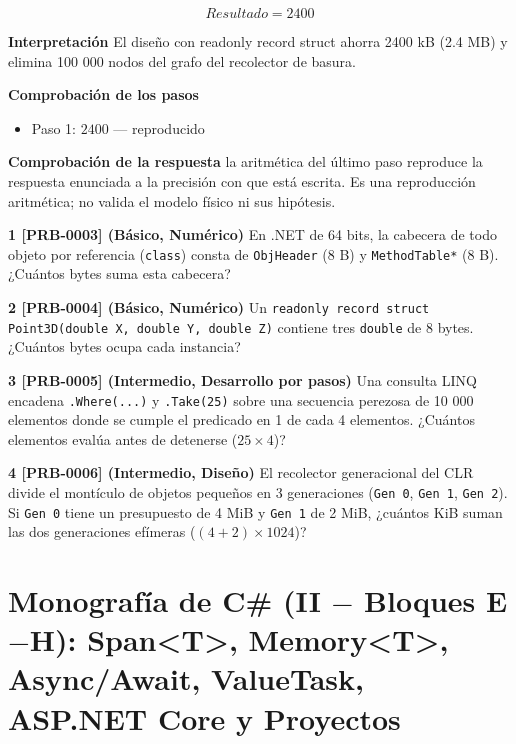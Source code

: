 \documentclass{book}
\begin{document}
\begin{tcolorbox}[title={Problema resuelto}, studiumworked, breakable]
\[
Resultado = 2400
\]

\noindent\textbf{Interpretación}
El diseño con readonly record struct ahorra 2400 kB (2.4 MB) y elimina 100 000 nodos del grafo del recolector de basura.

\noindent\textbf{Comprobación de los pasos}
\begin{itemize}
\item Paso 1: $2400$ — reproducido
\end{itemize}

\noindent\textbf{Comprobación de la respuesta} la aritmética del último paso reproduce la respuesta enunciada a la precisión con que está escrita. Es una reproducción aritmética; no valida el modelo físico ni sus hipótesis.
\end{tcolorbox}

\begin{tcolorbox}[title={Ejercicios}, studiumworked, breakable]

\noindent\textbf{1 [PRB-0003] (Básico, Numérico)}
En .NET de 64 bits, la cabecera de todo objeto por referencia (\texttt{class}) consta de \texttt{ObjHeader} (8 B) y \texttt{MethodTable*} (8 B). ¿Cuántos bytes suma esta cabecera?

\noindent\textbf{2 [PRB-0004] (Básico, Numérico)}
Un \texttt{readonly record struct Point3D(double X, double Y, double Z)} contiene tres \texttt{double} de 8 bytes. ¿Cuántos bytes ocupa cada instancia?

\noindent\textbf{3 [PRB-0005] (Intermedio, Desarrollo por pasos)}
Una consulta LINQ encadena \texttt{.Where(...)} y \texttt{.Take(25)} sobre una secuencia perezosa de 10 000 elementos donde se cumple el predicado en 1 de cada 4 elementos. ¿Cuántos elementos evalúa antes de detenerse (\(25 \times 4\))?

\noindent\textbf{4 [PRB-0006] (Intermedio, Diseño)}
El recolector generacional del CLR divide el montículo de objetos pequeños en 3 generaciones (\texttt{Gen 0}, \texttt{Gen 1}, \texttt{Gen 2}). Si \texttt{Gen 0} tiene un presupuesto de 4 MiB y \texttt{Gen 1} de 2 MiB, ¿cuántos KiB suman las dos generaciones efímeras (\((4 + 2) \times 1024\))?
\end{tcolorbox}

\chapter{Monografía de C\# (II \(-\) Bloques E\(-\)H): Span<T>, Memory<T>, Async/Await, ValueTask, ASP.NET Core y Proyectos}
\label{chap:cap02-csharp-avanzado-experto-span-async-valuetask-aspnet-proyectos}
\end{document}
